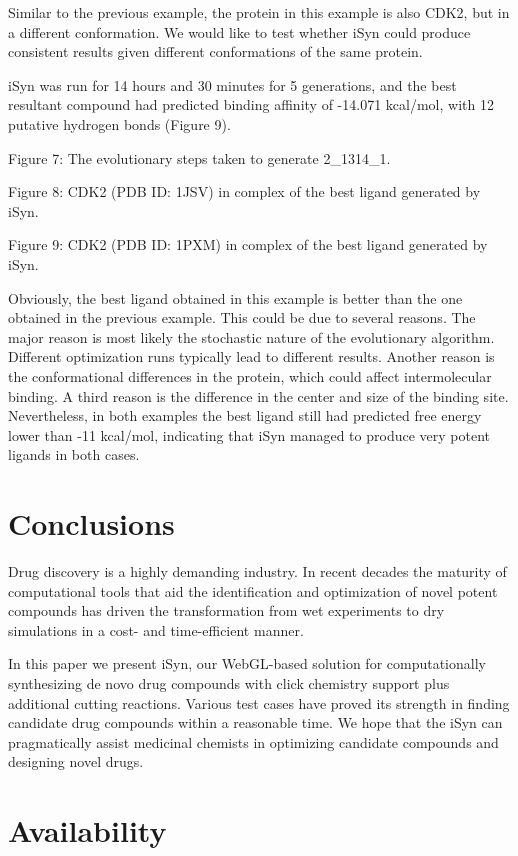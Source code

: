 Similar to the previous example, the protein in this example is also CDK2, but in a different conformation. We would like to test whether iSyn could produce consistent results given different conformations of the same protein.

iSyn was run for 14 hours and 30 minutes for 5 generations, and the best resultant compound had predicted binding affinity of -14.071 kcal/mol, with 12 putative hydrogen bonds (Figure 9).
 
Figure 7: The evolutionary steps taken to generate 2\_1314\_1.

Figure 8: CDK2 (PDB ID: 1JSV) in complex of the best ligand generated by iSyn.

Figure 9: CDK2 (PDB ID: 1PXM) in complex of the best ligand generated by iSyn.

Obviously, the best ligand obtained in this example is better than the one obtained in the previous example. This could be due to several reasons. The major reason is most likely the stochastic nature of the evolutionary algorithm. Different optimization runs typically lead to different results. Another reason is the conformational differences in the protein, which could affect intermolecular binding. A third reason is the difference in the center and size of the binding site. Nevertheless, in both examples the best ligand still had predicted free energy lower than -11 kcal/mol, indicating that iSyn managed to produce very potent ligands in both cases.

\section{Conclusions}

Drug discovery is a highly demanding industry. In recent decades the maturity of computational tools that aid the identification and optimization of novel potent compounds has driven the transformation from wet experiments to dry simulations in a cost- and time-efficient manner.

In this paper we present iSyn, our WebGL-based solution for computationally synthesizing de novo drug compounds with click chemistry support plus additional cutting reactions. Various test cases have proved its strength in finding candidate drug compounds within a reasonable time. We hope that the iSyn can pragmatically assist medicinal chemists in optimizing candidate compounds and designing novel drugs.

\section{Availability}


